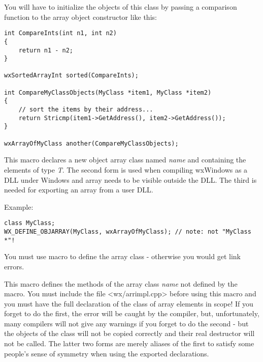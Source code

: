 You will have to initialize the objects of this class by passing a comparison
function to the array object constructor like this:

\begin{verbatim}
int CompareInts(int n1, int n2)
{
    return n1 - n2;
}

wxSortedArrayInt sorted(CompareInts);

int CompareMyClassObjects(MyClass *item1, MyClass *item2)
{
    // sort the items by their address...
    return Stricmp(item1->GetAddress(), item2->GetAddress());
}

wxArrayOfMyClass another(CompareMyClassObjects);
\end{verbatim}

\label{wxdeclareobjarray}




This macro declares a new object array class named {\it name} and containing
the elements of type {\it T}. The second form is used when compiling wxWindows as
a DLL under Windows and array needs to be visible outside the DLL.  The third is
needed for exporting an array from a user DLL.

Example:

\begin{verbatim}
class MyClass;
WX_DEFINE_OBJARRAY(MyClass, wxArrayOfMyClass); // note: not "MyClass *"!
\end{verbatim}

You must use  macro to define
the array class - otherwise you would get link errors.

\label{wxdefineobjarray}




This macro defines the methods of the array class {\it name} not defined by the 
 macro. You must include the
file <wx/arrimpl.cpp> before using this macro and you must have the full
declaration of the class of array elements in scope! If you forget to do the 
first, the error will be caught by the compiler, but, unfortunately, many
compilers will not give any warnings if you forget to do the second - but the
objects of the class will not be copied correctly and their real destructor will
not be called.  The latter two forms are merely aliases of the first to satisfy
some people's sense of symmetry when using the exported declarations.

